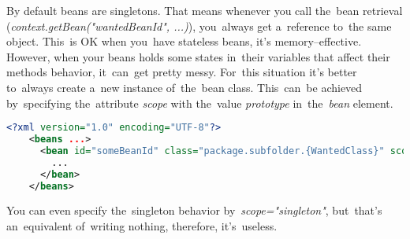 
By default beans are singletons. That means whenever you call the~bean retrieval (\textit{context.getBean("wantedBeanId", ...)}), you~always get a~reference to~the same object. This~is OK when you~have stateless beans, it's memory--effective. However, when your beans holds some states in~their variables that affect their methods behavior, it~can~get pretty messy. For~this situation it's better to~always create a~new instance of~the~bean class. This~can~be achieved by~specifying the~attribute \textit{scope} with the~value \textit{prototype} in~the~\textit{bean} element.

\example
\begin{lstlisting}[language=XML, title={Configuration XML}]
    <?xml version="1.0" encoding="UTF-8"?>
    <beans ...>
      <bean id="someBeanId" class="package.subfolder.{WantedClass}" scope="prototype">
        ...
      </bean>
    </beans>
\end{lstlisting}

\note You can even specify the~singleton behavior by~\textit{scope="singleton"}, but~that's an~equivalent of~writing nothing, therefore, it's~useless.